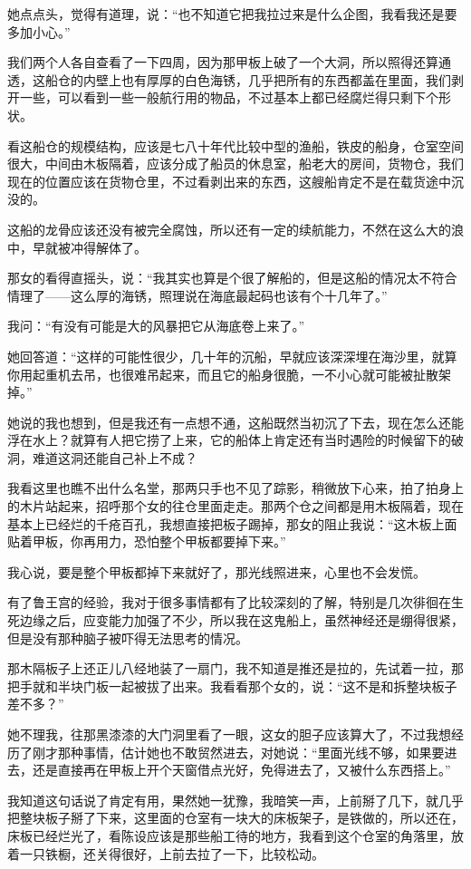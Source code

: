 她点点头，觉得有道理，说：“也不知道它把我拉过来是什么企图，我看我还是要多加小心。”

我们两个人各自查看了一下四周，因为那甲板上破了一个大洞，所以照得还算通透，这船仓的内壁上也有厚厚的白色海锈，几乎把所有的东西都盖在里面，我们剥开一些，可以看到一些一般航行用的物品，不过基本上都已经腐烂得只剩下个形状。

看这船仓的规模结构，应该是七八十年代比较中型的渔船，铁皮的船身，仓室空间很大，中间由木板隔着，应该分成了船员的休息室，船老大的房间，货物仓，我们现在的位置应该在货物仓里，不过看剥出来的东西，这艘船肯定不是在载货途中沉没的。

这船的龙骨应该还没有被完全腐蚀，所以还有一定的续航能力，不然在这么大的浪中，早就被冲得解体了。

那女的看得直摇头，说：“我其实也算是个很了解船的，但是这船的情况太不符合情理了——这么厚的海锈，照理说在海底最起码也该有个十几年了。”

我问：“有没有可能是大的风暴把它从海底卷上来了。”

她回答道：“这样的可能性很少，几十年的沉船，早就应该深深埋在海沙里，就算你用起重机去吊，也很难吊起来，而且它的船身很脆，一不小心就可能被扯散架掉。”

她说的我也想到，但是我还有一点想不通，这船既然当初沉了下去，现在怎么还能浮在水上？就算有人把它捞了上来，它的船体上肯定还有当时遇险的时候留下的破洞，难道这洞还能自己补上不成？

我看这里也瞧不出什么名堂，那两只手也不见了踪影，稍微放下心来，拍了拍身上的木片站起来，招呼那个女的往仓里面走走。那两个仓之间都是用木板隔着，现在基本上已经烂的千疮百孔，我想直接把板子踢掉，那女的阻止我说：“这木板上面贴着甲板，你再用力，恐怕整个甲板都要掉下来。”

我心说，要是整个甲板都掉下来就好了，那光线照进来，心里也不会发慌。

有了鲁王宫的经验，我对于很多事情都有了比较深刻的了解，特别是几次徘徊在生死边缘之后，应变能力加强了不少，所以我在这鬼船上，虽然神经还是绷得很紧，但是没有那种脑子被吓得无法思考的情况。

那木隔板子上还正儿八经地装了一扇门，我不知道是推还是拉的，先试着一拉，那把手就和半块门板一起被拔了出来。我看看那个女的，说：“这不是和拆整块板子差不多？”

她不理我，往那黑漆漆的大门洞里看了一眼，这女的胆子应该算大了，不过我想经历了刚才那种事情，估计她也不敢贸然进去，对她说：“里面光线不够，如果要进去，还是直接再在甲板上开个天窗借点光好，免得进去了，又被什么东西搭上。”

我知道这句话说了肯定有用，果然她一犹豫，我暗笑一声，上前掰了几下，就几乎把整块板子掰了下来，这里面的仓室有一块大的床板架子，是铁做的，所以还在，床板已经烂光了，看陈设应该是那些船工待的地方，我看到这个仓室的角落里，放着一只铁橱，还关得很好，上前去拉了一下，比较松动。

